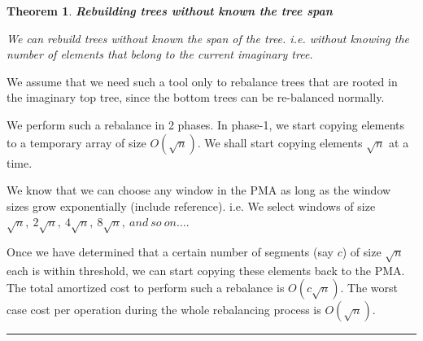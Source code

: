 \documentclass{article}
\newenvironment{proof}{{\bf Proof:  }}{\hfill\rule{2mm}{2mm}}
\newtheorem{theorem}[fact]{Theorem}
\begin{document}
\begin{theorem}
\textbf{Rebuilding trees without known the tree span}

We can rebuild trees without known the span of the tree. i.e. without
knowing the number of elements that belong to the current imaginary
tree.

\end{theorem}

\begin{proof}
We assume that we need such a tool only to rebalance trees that are
rooted in the imaginary top tree, since the bottom trees can be
re-balanced normally.

We perform such a rebalance in 2 phases. In phase-1, we start copying
elements to a temporary array of size $O(\sqrt{n})$. We shall start
copying elements $\sqrt{n}$ at a time.

We know that we can choose any window in the PMA as long as the window
sizes grow exponentially (include reference). i.e. We select windows
of size
$\sqrt{n},\ 2\sqrt{n},\ 4\sqrt{n},\ 8\sqrt{n},\ and\ so\ on\ldots{}$.

Once we have determined that a certain number of segments (say $c$) of
size $\sqrt{n}$ each is within threshold, we can start copying these
elements back to the PMA. The total amortized cost to perform such a
rebalance is $O(c\sqrt{n})$. The worst case cost per operation during
the whole rebalancing process is $O(\sqrt{n})$.
\end{proof}
\end{document}
